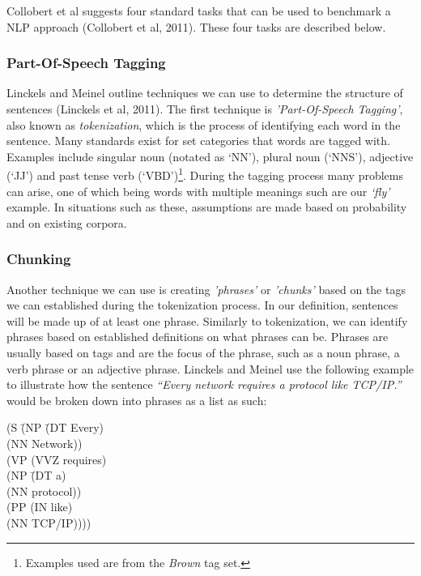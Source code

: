 \documentclass[12pt,a4paper]{article}
\begin{document}
Collobert et al suggests four standard tasks that can be used to benchmark a NLP approach (Collobert et al, 2011). These four tasks are described below. \newline

\subsubsection{Part-Of-Speech Tagging}
Linckels and Meinel outline techniques we can use to determine the structure of sentences (Linckels et al, 2011). The first technique is \emph{'Part-Of-Speech Tagging'}, also known as \emph{tokenization}, which is the process of identifying each word in the sentence. Many standards exist for set categories that words are tagged with. Examples include singular noun (notated as `NN'), plural noun (`NNS'), adjective (`JJ') and past tense verb (`VBD')\footnote{Examples used are from the \emph{Brown} tag set.}. During the tagging process many problems can arise, one of which being words with multiple meanings such are our \emph{`fly'} example. In situations such as these, assumptions are made based on probability and on existing corpora.\newline

\subsubsection{Chunking}
Another technique we can use is creating \emph{'phrases'} or \emph{'chunks'} based on the tags we can established during the tokenization process. In our definition, sentences will be made up of at least one phrase. Similarly to tokenization, we can identify phrases based on established definitions on what phrases can be. Phrases are usually based on tags and are the focus of the phrase, such as a noun phrase, a verb phrase or an adjective phrase. Linckels and Meinel use the following example to illustrate how the sentence \emph{``Every network requires a protocol like TCP/IP.''} would be broken down into phrases as a list as such:\newline

\begin{center}
\parbox{0cm}{\begin{tabbing}
(S \= (NP \= (DT Every)\\
\> \> (NN Network))\\
\> (VP (VVZ requires)\\
\> \> (NP \= (DT a)\\
\> \> \> (NN protocol))\\
\> \> (PP (IN like)\\
\> \> \> (NN TCP/IP))))\\
\end{tabbing}}
\end{center}
\end{document}
